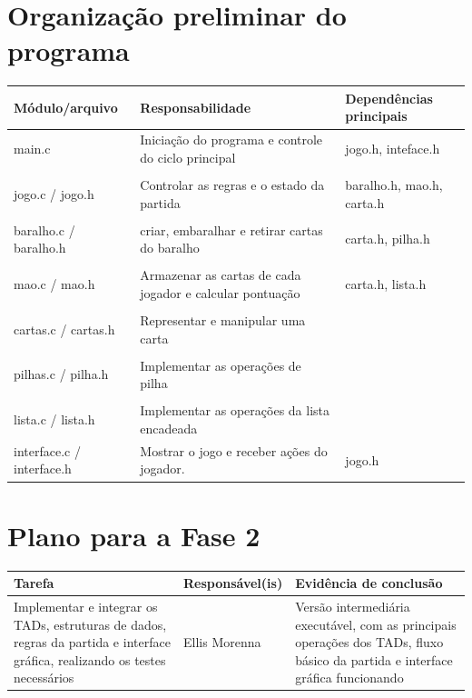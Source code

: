 \documentclass[11pt]{article}
\begin{document}
\section{Organização preliminar do programa}
\begin{tabularx}{\textwidth}{p{4cm} X X}
  \toprule
  Módulo/arquivo & Responsabilidade & Dependências principais \\
  \midrule
   main.c & Iniciação do programa e controle do ciclo principal & jogo.h, inteface.h\\
   \\
   jogo.c / jogo.h & Controlar as regras e o estado da partida & baralho.h, mao.h, carta.h\\
   \\
   baralho.c / baralho.h & criar, embaralhar e retirar cartas do baralho & carta.h, pilha.h \\
   \\
   mao.c / mao.h & Armazenar as cartas de cada jogador e calcular pontuação & carta.h, lista.h\\
   \\
   cartas.c / cartas.h & Representar e manipular uma carta & \\
   \\
   pilhas.c / pilha.h & Implementar as operações de pilha & \\
   \\
   lista.c / lista.h & Implementar as operações da lista encadeada &  \\
   
   interface.c / interface.h & Mostrar o jogo e receber ações do jogador. & jogo.h\\
   
   
  \bottomrule
\end{tabularx}

\section{Plano para a Fase 2}
\begin{tabularx}{\textwidth}{X p{4cm} p{4cm}}
  \toprule
  Tarefa & Responsável(is) & Evidência de conclusão \\
  \midrule
   Implementar e integrar os TADs, estruturas de dados, regras da partida e interface gráfica, realizando os testes necessários & Ellis Morenna & Versão intermediária executável, com as principais operações dos TADs, fluxo básico da partida e interface gráfica funcionando\\
   
  \bottomrule
\end{tabularx}
\end{document}

